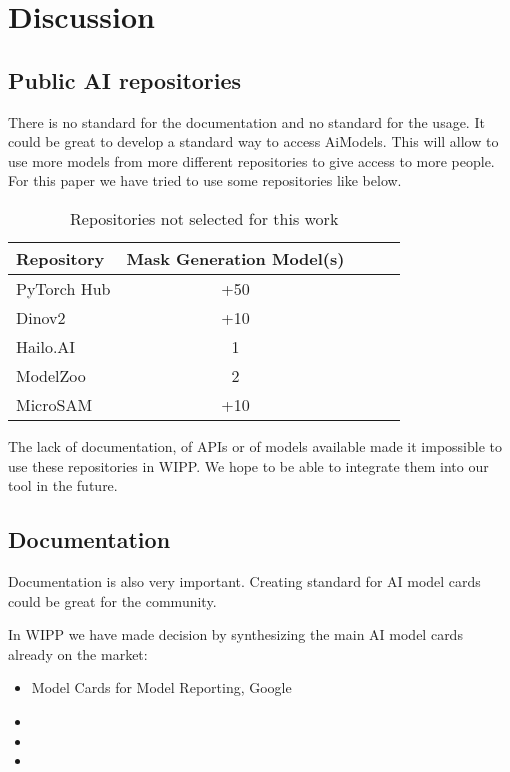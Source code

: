 \section{Discussion}
\label{sec:discussion}

\subsection{Public AI repositories}

There is no standard for the documentation and no standard for the usage.
It could be great to develop a standard
way to access \Gls{AiModel}s. This will allow to use more models from more different
repositories to give access to more people. For this paper we have tried to use
some repositories like below.

\begin{table}[H]
    \centering
    \caption{\label{tab:discussion}%
        Repositories not selected for this work
    }
    \begin{tabular}{lcccc}
      \toprule
      Repository & Mask Generation Model(s) \\
      \midrule
      PyTorch Hub & +50 \\
      Dinov2 & +10 \\
      Hailo.AI & 1 \\
      ModelZoo & 2 \\
      MicroSAM & +10 \\
      \bottomrule
    \end{tabular}
\end{table}

The lack of documentation, of APIs or of models available made it impossible to
use these repositories in WIPP. We hope to be able to integrate them into our
tool in the future.

\subsection{Documentation}

Documentation is also very important. Creating standard for AI model cards
could be great for the community.

In \Gls{WIPP} we have made decision by synthesizing the main AI model cards
already on the market:
\begin{itemize}
    \item Model Cards for Model Reporting, Google \cite{DBLP:journals/corr/abs-1810-03993}
    \item 
    \item 
    \item 
\end{itemize}



